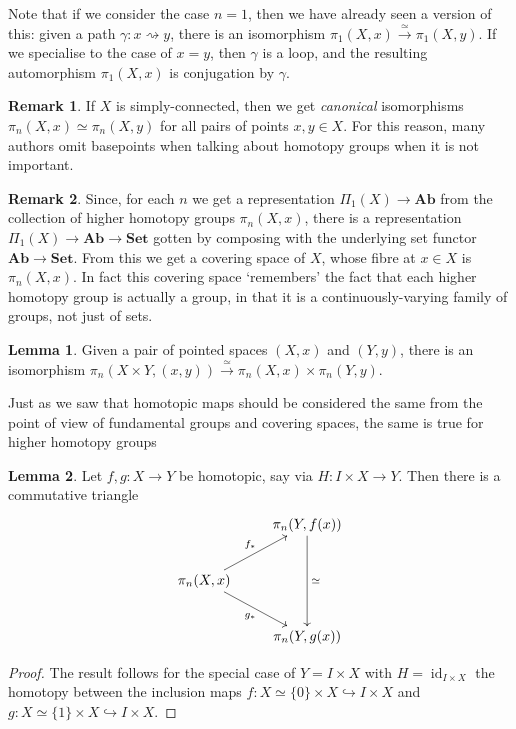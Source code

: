 \documentclass{tufte-handout}
\def\into {\hookrightarrow}
\def\Set {\mathbf{Set}}
\def\Ab {\mathbf{Ab}}
\DeclareMathOperator{\id}{id}
\theoremstyle{definition}
\newtheorem{lemma}{Lemma}
\newtheorem*{rem}{Remark}
\begin{document}
Note that if we consider the case $n=1$, then we have already seen a version of this: given a path $\gamma\colon x\rightsquigarrow y$, there is an isomorphism $\pi_1(X,x) \xrightarrow{\simeq} \pi_1(X,y)$. If we specialise to the case of $x=y$, then $\gamma$ is a loop, and the resulting automorphism $\pi_1(X,x)$ is conjugation by $\gamma$.

\begin{rem}
If $X$ is simply-connected, then we get \emph{canonical} isomorphisms $\pi_n(X,x) \simeq \pi_n(X,y)$ for all pairs of points $x,y\in X$. For this reason, many authors omit basepoints when talking about homotopy groups when it is not important.
\end{rem}

\begin{rem}
Since, for each $n$ we get a representation $\Pi_1(X) \to \Ab$ from the collection of higher homotopy groups $\pi_n(X,x)$, there is a representation $\Pi_1(X) \to \Ab \to \Set$ gotten by composing with the underlying set functor $\Ab \to \Set$. From this we get a covering space of $X$, whose fibre at $x\in X$ is $\pi_n(X,x)$. In fact this covering space `remembers' the fact that each higher homotopy group is actually a group, in that it is a continuously-varying family of groups, not just of sets.
\end{rem}

\begin{lemma}
Given a pair of pointed spaces $(X,x)$ and $(Y,y)$, there is an isomorphism $\pi_n(X\times Y,(x,y)) \xrightarrow{\simeq} \pi_n(X,x) \times \pi_n(Y,y)$.
\end{lemma}

Just as we saw that homotopic maps should be considered the same from the point of view of fundamental groups and covering spaces, the same is true for higher homotopy groups

\begin{lemma}
Let $f,g\colon X\to Y$ be homotopic, say via $H\colon I\times X \to Y$. Then there is a commutative triangle
\[
  \xymatrix{
    & \pi_n(Y,f(x)) \ar[dd]^{\simeq}\\
    \pi_n(X,x) \ar[ur]^{f_*} \ar[dr]_{g_*} \\
    & \pi_n(Y,g(x))
  }
\]
\end{lemma}
\begin{proof}
The result follows for the special case of $Y = I\times X$ with $H=\id_{I\times X}$ the homotopy between the inclusion maps $f\colon X\simeq \{0\}\times X \into I \times X$ and $g\colon X\simeq \{1\}\times X \into I \times X$.

\end{proof}
\end{document}

